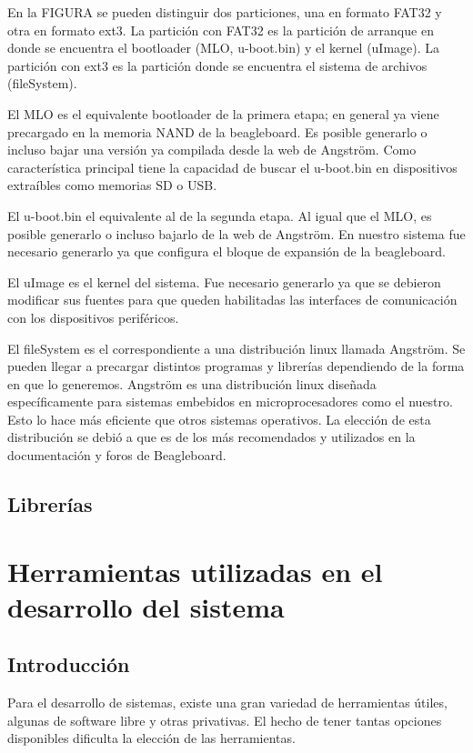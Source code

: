 En la FIGURA se pueden distinguir dos particiones, una en formato FAT32 y otra en formato ext3.
La partición con FAT32 es la partición de arranque en donde se encuentra el bootloader (MLO, u-boot.bin) y el kernel (uImage).
La partición con ext3 es la partición donde se encuentra el sistema de archivos (fileSystem).

El MLO es el equivalente bootloader de la primera etapa; en general ya viene precargado en la memoria NAND de la beagleboard. Es posible generarlo o incluso bajar una versión ya compilada desde la web de Angström. Como característica principal tiene la capacidad de buscar el u-boot.bin en dispositivos extraíbles como memorias SD o USB.

El u-boot.bin el equivalente al de la segunda etapa. Al igual que el MLO, es posible generarlo o incluso bajarlo de la web de Angström. En nuestro sistema fue necesario generarlo ya que configura el bloque de expansión de la beagleboard.

El uImage es el kernel del sistema. Fue necesario generarlo ya que se debieron modificar sus fuentes para que queden habilitadas las interfaces de comunicación con los dispositivos periféricos.

El fileSystem es el correspondiente a una distribución linux llamada Angström. Se pueden llegar a precargar distintos programas y librerías dependiendo de la forma en que lo generemos.
Angström es una distribución linux diseñada específicamente para sistemas embebidos en microprocesadores como el nuestro. Esto lo hace más eficiente que otros sistemas operativos. La elección de esta distribución se debió a que es de los más recomendados y utilizados en la documentación y foros de Beagleboard.


\subsection{Librerías}


\section{Herramientas utilizadas en el desarrollo del sistema}

\subsection{Introducción}
Para el desarrollo de sistemas, existe una gran variedad de herramientas útiles, algunas de software libre y otras privativas. El hecho de tener tantas opciones disponibles dificulta la elección de las herramientas. 

